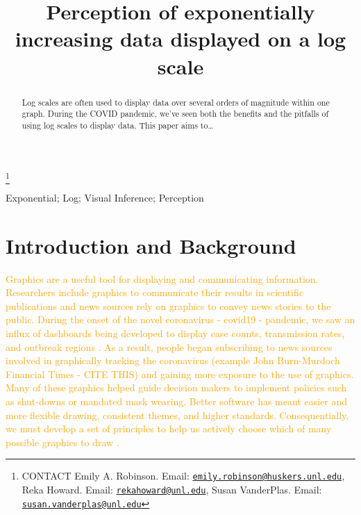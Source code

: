 \documentclass[]{interact}
\theoremstyle{plain}%
\theoremstyle{definition}
\theoremstyle{remark}
\begin{document}

\title{Perception of exponentially increasing data displayed on a log scale}


\author{
}

\thanks{CONTACT Emily A. Robinson. Email: \href{mailto:emily.robinson@huskers.unl.edu}{\nolinkurl{emily.robinson@huskers.unl.edu}}, Reka Howard. Email: \href{mailto:rekahoward@unl.edu}{\nolinkurl{rekahoward@unl.edu}}, Susan VanderPlas. Email: \href{mailto:susan.vanderplas@unl.edu}{\nolinkurl{susan.vanderplas@unl.edu}}}

\maketitle

\begin{abstract}
Log scales are often used to display data over several orders of
magnitude within one graph. During the COVID pandemic, we've seen both
the benefits and the pitfalls of using log scales to display data. This
paper aims to\ldots{}
\end{abstract}

\begin{keywords}
Exponential; Log; Visual Inference; Perception
\end{keywords}

\hypertarget{introduction-and-background}{%
\section{Introduction and
Background}\label{introduction-and-background}}

\textcolor{Orange}{
Graphics are a useful tool for displaying and communicating information. 
Researchers include graphics to communicate their results in scientific publications and news sources rely on graphics to convey news stories to the public. 
During the onset of the novel coronavirus - covid19 - pandemic, we saw an influx of dashboards being developed to display case counts, transmission rates, and outbreak regions \citep{lisa_charlotte_2020}.
As a result, people began subscribing to news sources involved in graphically tracking the coronavirus (example John Burn-Murdoch Financial Times - CITE THIS) and gaining more exposure to the use of graphics. 
Many of these graphics helped guide decision makers to implement policies such as shut-downs or mandated mask wearing. 
Better software has meant easier and more flexible drawing, consistent themes, and higher standards.
Consequentially, we must develop a set of principles to help us actively choose which of many possible graphics to draw \citep{unwin_why_2020}.
}
\end{document}
